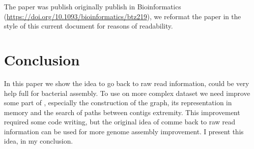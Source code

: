 \documentclass[main.tex]{subfiles}
\begin{document}
The paper was publish originally publish in Bioinformatics (\url{https://doi.org/10.1093/bioinformatics/btz219}), we reformat the paper in the style of this current document for reasons of readability.





\section{Conclusion}

In this paper we show the idea to go back to raw read information, could be very help full for bacterial assembly. To use \knot on more complex dataset we need improve some part of \knot, especially the construction of the graph, its representation in memory and the search of paths between contigs extremity. This improvement required some code writing, but the original idea of comme back to raw read information can be used for more genome assembly improvement. I present this idea, in my conclusion.


\end{document}
